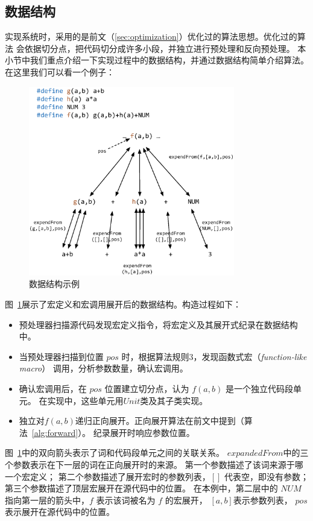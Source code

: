 \subsection{数据结构}\label{sec:datastruct}
实现系统时，采用的是前文（\ref{sec:optimization}）优化过的算法思想。优化过的算法
会依据切分点，把代码切分成许多小段，并独立进行预处理和反向预处理。
本小节中我们重点介绍一下实现过程中的数据结构，并通过数据结构简单介绍算法。
在这里我们可以看一个例子：
\begin{figure}
\centering
\includegraphics[width=9cm]{pics/original.eps}
\caption{数据结构示例 \label{pic:datastruct}}
\end{figure}

图~\ref{pic:datastruct}展示了宏定义和宏调用展开后的数据结构。构造过程如下：
\begin{itemize}
\item 预处理器扫描源代码发现宏定义指令，将宏定义及其展开式纪录在数据结构中。
\item 当预处理器扫描到位置 $pos$ 时，根据算法规则3，发现函数式宏（\emph{function-like macro}）
  调用，分析参数数量，确认宏调用。
\item 确认宏调用后，在 $pos$ 位置建立切分点，认为 $f(a, b)$ 是一个独立代码段单元。
  在实现中，这些单元用$Unit$类及其子类实现。
\item 独立对$f(a, b)$递归正向展开。正向展开算法在前文中提到（算法~\ref{alg:forward}）。
  纪录展开时响应参数位置。
\end{itemize}

图~\ref{pic:datastruct}中的双向箭头表示了词和代码段单元之间的关联关系。
$expandedFrom$中的三个参数表示在下一层的词在正向展开时的来源。
第一个参数描述了该词来源于哪一个宏定义；
第二个参数描述了展开宏时的参数列表，$[]$ 代表空，即没有参数；
第三个参数描述了顶层宏展开在源代码中的位置。
在本例中，第二层中的 $NUM$ 指向第一层的箭头中，$f$ 表示该词被名为 $f$ 的宏展开，
$[a, b]$表示参数列表， $pos$表示展开在源代码中的位置。

